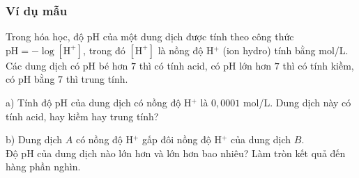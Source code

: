 \subsubsection{Ví dụ mẫu}
\begin{vd}%
	Trong hóa học, độ  pH  của một dung dịch được tính theo công thức $\text{pH}=-\log[\text{H}^+] $, trong đó $ [\text{H}^+] $ là nồng độ  H$^+ $ (ion hydro) tính bằng mol/L. Các dung dịch có  pH  bé hơn $ 7 $ thì có tính acid, có pH  lớn hơn $ 7 $ thì có tính kiềm, có  pH  bằng $ 7 $ thì trung tính.
	\begin{listEX}[1]
		\item[a)] Tính độ  pH  của dung dịch có nồng độ H$^+ $ là $ 0{,}0001 $ mol/L. Dung dịch này có tính acid, hay kiềm hay trung tính?
		\item[b)] Dung dịch $ A $ có nồng độ  H$^+ $ gấp đôi nồng độ  H$^+ $ của dung dịch $ B $.\\
		Độ pH  của dung dịch nào lớn hơn và lớn hơn bao nhiêu? Làm tròn kết quả đến hàng phần nghìn.
	\end{listEX}
\end{vd}

